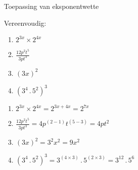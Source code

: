       

\begin{wex}
{ %
Toepassing van eksponentwette
}
{%
Vereenvoudig:

\begin{enumerate}[noitemsep, label=\textbf{\arabic*}.]
\item  $2^{3x} \times 2^{4x}$
\\
 \item $\frac{12p^2t^5}{3pt^3}$
\\
 \item $ (3x)^2 $
\\
 \item $(3^4\,.\,5^2)^3$\\
\end{enumerate}

}
{%

\begin{enumerate}[noitemsep, label=\textbf{\arabic*}.]
\item  $2^{3x} \times 2^{4x} = 2^{3x+4x} = 2^{7x}$
\\
 \item $\frac{12p^2t^5}{3pt^3} = 4p^{(2-1)}t^{(5-3)} = 4pt^2$
\\
 \item $ (3x)^2 = 3^2x^2 = 9x^2$
\\
 \item $(3^4\,.\,5^2)^3 = 3^{(4\times3)}\,.\,5^{(2\times3)} = 3^{12}\,.\,5^6  $
\end{enumerate}



}


\end{wex}









